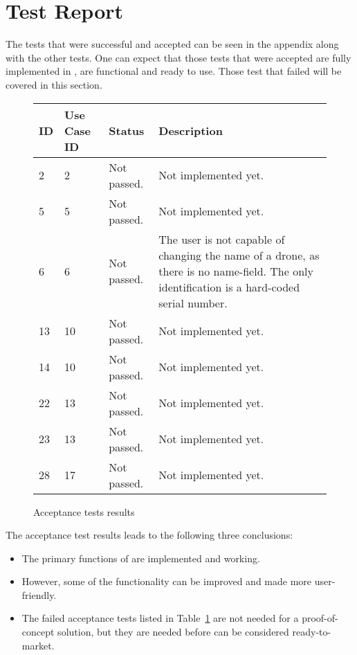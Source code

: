 \section{Test Report}
\label{sec:testing_report}

The tests that were successful and accepted can be seen in the appendix along with the other tests.
One can expect that those tests that were accepted are fully implemented in \projectname{}, are functional and ready to use. 
Those test that failed will be covered in this section. \\


\begin{figure}[htb]
\begin{center}
\begin{tabular}{ | l | l | l | p{8cm} | }
  \hline
	\textbf{ID} & \textbf{Use Case ID} & \textbf{Status} & \textbf{Description} \\ \hline
	2 & 2 & Not passed. & Not implemented yet. \\ \hline
	5 & 5 & Not passed. & Not implemented yet. \\ \hline
	6 & 6 & Not passed. & The user is not capable of changing the name of a drone, as there is no name-field. The only identification is a hard-coded serial number. \\ \hline
	13 & 10 & Not passed. & Not implemented yet. \\ \hline
	14 & 10 & Not passed. & Not implemented yet. \\ \hline
	22 & 13 & Not passed. & Not implemented yet. \\ \hline
	23 & 13 & Not passed. & Not implemented yet. \\ \hline
	28 & 17 & Not passed. & Not implemented yet. \\ \hline
  \hline
\end{tabular}
\caption{Acceptance tests results}
\label{tab:acceptance_tests_results_first_run}
\end{center}
\end{figure}

The acceptance test results leads to the following three conclusions:

\begin{itemize}
	\item The primary functions of \projectname{} are implemented and working. 
	\item However, some of the functionality can be improved and made more user-friendly. 
	\item The failed acceptance tests listed in Table~\ref{tab:acceptance_tests_results_first_run} are not needed for a proof-of-concept solution, but they are needed before \projectname{} can be considered ready-to-market.
\end{itemize}


